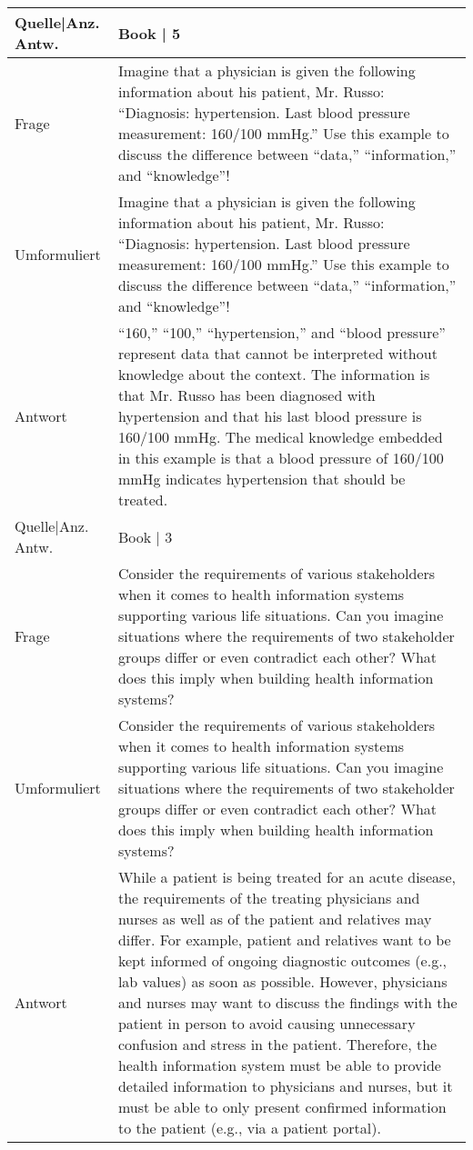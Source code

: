 {\begin{landscape}
\begin{longtable}{p{3cm}p{}}
    Quelle|Anz. Antw. &  Book  | 5 \\
    \midrule
    Frage & Imagine that a physician is given the following information about his patient, Mr. Russo: ``Diagnosis: hypertension.
    Last blood pressure measurement: 160/100 mmHg.'' Use this example to discuss the difference between ``data,'' ``information,'' and ``knowledge''! \\
    Umformuliert & Imagine that a physician is given the following information about his patient, Mr. Russo: ``Diagnosis: hypertension.
    Last blood pressure measurement: 160/100 mmHg.'' Use this example to discuss the difference between ``data,'' ``information,'' and ``knowledge''! \\
    Antwort & ``160,'' ``100,'' ``hypertension,'' and ``blood pressure'' represent data that cannot be interpreted without knowledge about the context.
    The information is that Mr. Russo has been diagnosed with hypertension and that his last blood pressure is 160/100 mmHg.
    The medical knowledge embedded in this example is that a blood pressure of 160/100 mmHg indicates hypertension that should be treated.\\
    Quelle|Anz. Antw. &  Book  | 3 \\
    \midrule
    Frage & Consider the requirements of various stakeholders when it comes to health information systems supporting various life situations.
    Can you imagine situations where the requirements of two stakeholder groups differ or even contradict each other? What does this imply when building health information systems? \\
    Umformuliert & Consider the requirements of various stakeholders when it comes to health information systems supporting various life situations.
    Can you imagine situations where the requirements of two stakeholder groups differ or even contradict each other? What does this imply when building health information systems? \\
    Antwort & While a patient is being treated for an acute disease, the requirements of the treating physicians and nurses as well as of the patient and relatives may differ.
    For example, patient and relatives want to be kept informed of ongoing diagnostic outcomes (e.g., lab values) as soon as possible.
    However, physicians and nurses may want to discuss the findings with the patient in person to avoid causing unnecessary confusion and stress in the patient.
    Therefore, the health information system must be able to provide detailed information to physicians and nurses, but it must be able to only present confirmed information to the patient (e.g., via a patient portal). \\

\end{longtable}
\end{landscape}}

